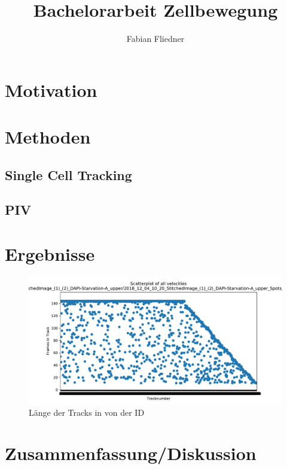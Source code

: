 \documentclass[]{article}
\title{Bachelorarbeit Zellbewegung}
\author{Fabian Fliedner}
\begin{document}
\maketitle
\begin{abstract}

\end{abstract}

\section{Motivation}
\section{Methoden}
\subsection{Single Cell Tracking}
\subsection{PIV}
\section{Ergebnisse}
\begin{figure}
	\centering
	\includegraphics[width=0.7\linewidth]{BildDateien/length_of_all_tracks}
	\caption[Tracklänge nach ID]{Länge der Tracks in von der ID}
	\label{fig:lengthofalltracks}
\end{figure}
\section{Zusammenfassung/Diskussion}
\end{document}
